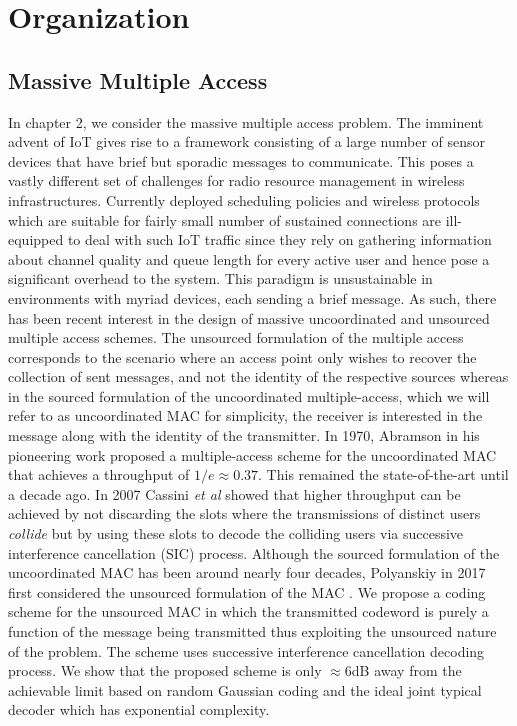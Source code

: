 \section{Organization}
\subsection*{Massive Multiple Access}
In chapter 2, we consider the massive multiple access problem.  The imminent advent of IoT gives rise to a framework consisting of a large number of sensor devices that have brief but sporadic messages to communicate. This poses a vastly different set of challenges for radio resource management in wireless infrastructures. Currently deployed scheduling policies and wireless protocols which are suitable for fairly small number of sustained connections are ill-equipped to deal with such IoT traffic since they rely on gathering information about channel quality and queue length for every active user and hence pose a significant overhead to the system. This paradigm is unsustainable in environments with myriad devices, each sending a brief message.  As such, there has been recent interest in the design of massive uncoordinated and unsourced multiple access schemes. The unsourced formulation of the multiple access corresponds to the scenario where an access point only wishes to recover the collection of sent messages, and not the identity of the respective sources whereas in the sourced formulation of the uncoordinated multiple-access, which we will refer to as uncoordinated MAC for simplicity, the receiver is interested in the message along with the identity of the transmitter. In 1970, Abramson in his pioneering work \cite{abramson1970aloha} proposed a multiple-access scheme for the uncoordinated MAC that achieves a throughput of $1/e\approx 0.37$. This remained the state-of-the-art until a decade ago. In 2007 \cite{casini2007contention} Cassini \textit{et al} showed that higher throughput can be achieved by not discarding the slots where the transmissions of distinct users \textit{collide} but by using these slots to decode the colliding users via successive interference cancellation (SIC) process. Although the sourced formulation of the uncoordinated MAC has been around nearly four decades, Polyanskiy in 2017 first considered the unsourced formulation of the MAC \cite{polyanskiy2017perspective}. We propose a coding scheme for the unsourced MAC in which the transmitted codeword is purely a function of the message being transmitted thus exploiting  the unsourced nature of the problem. The scheme uses successive interference cancellation decoding process. We show that the proposed scheme is only $\approx 6$dB away from the achievable limit based on random Gaussian coding and the ideal joint typical decoder which has exponential complexity. 

